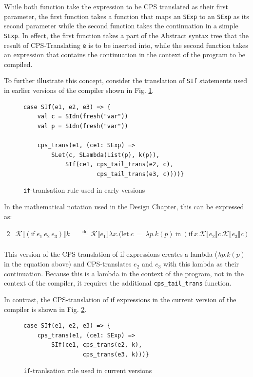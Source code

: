 \documentclass[11pt]{report}
\newcommand{\eqdef}{\stackrel{\text{def}}{=}}%
\newcommand{\cpstrans}[1]{\ensuremath{\mathcal{K}\llbracket #1 \rrbracket}}
\begin{document}
While both function take the expression to be CPS translated as their first parameter, the first function takes a function that maps an \texttt{SExp} to an \texttt{SExp} as its second parameter while the second function takes the continuation in a simple \texttt{SExp}. In effect, the first function takes a part of the Abstract syntax tree that the result of CPS-Translating \texttt{e} is to be inserted into, while the second function takes an expression that contains the continuation in the context of the program to be compiled.

To further illustrate this concept, consider the translation of \texttt{SIf} statements used in earlier versions of the compiler shown in Fig. \ref{ifcpstrans}.

\begin{figure}[ht]
\begin{lstlisting}
case SIf(e1, e2, e3) => {
    val c = SIdn(fresh("var"))
    val p = SIdn(fresh("var"))
    
    cps_trans(e1, (ce1: SExp) =>
        SLet(c, SLambda(List(p), k(p)),
            SIf(ce1, cps_tail_trans(e2, c), 
                     cps_tail_trans(e3, c))))}
\end{lstlisting}
\caption{\texttt{if}-tranlsation rule used in early versions}
\label{ifcpstrans}
\end{figure}

In the mathematical notation used in the Design Chapter, this can be expressed as:

\begin{alignat*}{2}
&\cpstrans{(\text{if}\ e_1\ e_2\ e_3)} k &&\eqdef \cpstrans{e_1} \lambda x.(\text{let}~c~=~\lambda p.k(p)~\text{in}~(\text{if}\ x\ \cpstrans{e_2}c\ \cpstrans{e_3}c) \\
\end{alignat*}

This version of the CPS-translation of if expressions creates a lambda ($\lambda p.k(p)$ in the equation above) and CPS-translates $e_2$ and $e_3$ with this lambda as their continuation. Because this is a lambda in the context of the program, not in the context of the compiler, it requires the additional \texttt{cps_tail_trans} function.

In contrast, the CPS-translation of if expressions in the current version of the compiler is shown in Fig. \ref{ifcpstranscurrent}.

\begin{figure}[ht]
\begin{lstlisting}
case SIf(e1, e2, e3) => {
    cps_trans(e1, (ce1: SExp) => 
        SIf(ce1, cps_trans(e2, k), 
                 cps_trans(e3, k)))}
\end{lstlisting}
\caption{\texttt{if}-tranlsation rule used in current versions}
\label{ifcpstranscurrent}
\end{figure}
\end{document}

